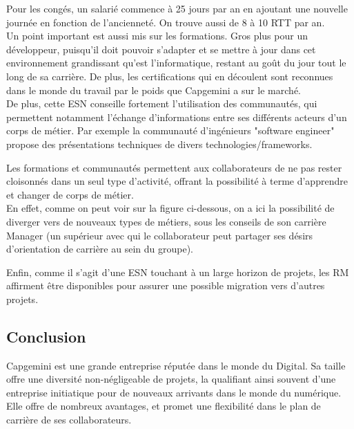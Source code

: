\documentclass{rapport}
\begin{document}
Pour les congés, un salarié commence à 25 jours par an en ajoutant une nouvelle journée en fonction de l'ancienneté. On trouve aussi de 8 à 10 RTT par an.\\

Un point important est aussi mis sur les formations. Gros plus pour un développeur, puisqu'il doit pouvoir s'adapter et se mettre à jour dans cet environnement grandissant qu'est l'informatique, restant au goût du jour tout le long de sa carrière. De plus, les certifications qui en découlent sont reconnues dans le monde du travail par le poids que Capgemini a sur le marché.\\

De plus, cette ESN conseille fortement l'utilisation des communautés, qui permettent notamment l'échange d'informations entre ses différents acteurs d'un corps de métier. Par exemple la communauté d'ingénieurs "software engineer" propose des présentations techniques de divers technologies/frameworks.

Les formations et communautés permettent aux collaborateurs de ne pas rester cloisonnés dans un seul type d'activité, offrant la possibilité à terme d'apprendre et changer de corps de métier.\\

En effet, comme on peut voir sur la figure ci-dessous, on a ici la possibilité de diverger vers de nouveaux types de métiers, sous les conseils de son carrière Manager (un supérieur avec qui le collaborateur peut partager ses désirs d'orientation de carrière au sein du groupe).\\


Enfin, comme il s'agit d'une ESN touchant à un large horizon de projets, les RM affirment être disponibles pour assurer une possible migration vers d'autres projets. 

\subsection*{Conclusion}

Capgemini est une grande entreprise réputée dans le monde du Digital. Sa taille offre une diversité non-négligeable de projets, la qualifiant ainsi souvent d'une entreprise initiatique pour de nouveaux arrivants dans le monde du numérique.
Elle offre de nombreux avantages, et promet une flexibilité dans le plan de carrière de ses collaborateurs.
\end{document}
